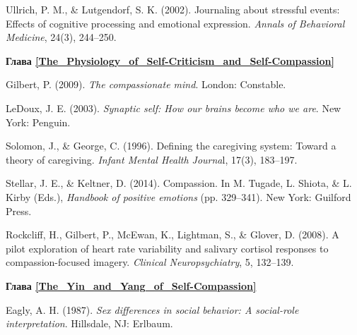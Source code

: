\begin{thebibliography}{999}
	 Ullrich, P. M., \& Lutgendorf, S. K. (2002). Journaling about stressful events: Effects of cognitive processing and emotional expression. \textit{Annals of Behavioral Medicine}, 24(3), 244–250.
	
	
	\vspace{3ex}
	\textbf{Глава \ref{The_Physiology_of_Self-Criticism_and_Self-Compassion}}
	
	 Gilbert, P. (2009). \textit{The compassionate mind}. London: Constable.
	
	 LeDoux, J. E. (2003). \textit{Synaptic self: How our brains become who we are}. New York: Penguin.
		
	 Solomon, J., \& George, C. (1996). Defining the caregiving system: Toward a theory of caregiving. \textit{Infant Mental Health Journa}l, 17(3), 183–197.
	
	 Stellar, J. E., \& Keltner, D. (2014). Compassion. In M. Tugade, L. Shiota, \& L. Kirby (Eds.), \textit{Handbook of positive emotions} (pp. 329–341). New York: Guilford Press.
	
	 Rockcliff, H., Gilbert, P., McEwan, K., Lightman, S., \& Glover, D. (2008). A pilot exploration of heart rate variability and salivary cortisol responses to compassion-focused imagery. \textit{Clinical Neuropsychiatry}, 5, 132–139.


 	\vspace{3ex}
 	\textbf{Глава \ref{The_Yin_and_Yang_of_Self-Compassion}}

	 Eagly, A. H. (1987). \textit{Sex differences in social behavior: A social-role interpretation}. Hillsdale, NJ: Erlbaum.
	
	
\end{thebibliography}
